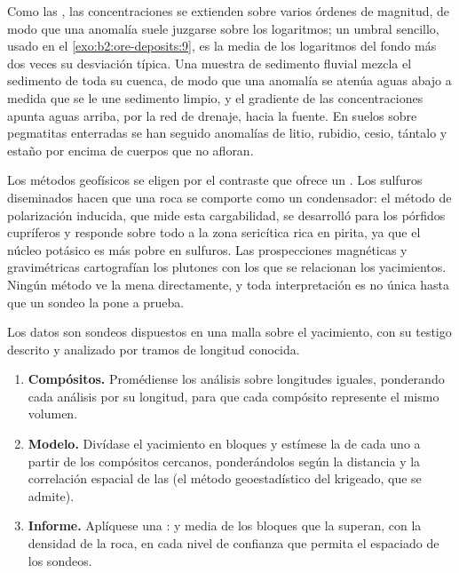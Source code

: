 Como las , las concentraciones se extienden sobre varios órdenes de magnitud, de modo que una anomalía suele juzgarse sobre
los logaritmos; un umbral sencillo, usado en el \cref{exo:b2:ore-deposits:9}, es la media de
los logaritmos del fondo más dos veces su desviación típica. Una muestra de sedimento fluvial
mezcla el sedimento de toda su cuenca, de modo que una anomalía se atenúa aguas abajo a medida que se le une sedimento limpio,
y el gradiente de las concentraciones apunta aguas arriba, por la red de drenaje, hacia la fuente. En suelos sobre
pegmatitas enterradas se han seguido anomalías de litio, rubidio, cesio, tántalo y estaño por encima de
cuerpos que no afloran.

Los métodos geofísicos se eligen por el contraste que ofrece un . Los sulfuros diseminados hacen que una
roca se comporte como un condensador: el método de polarización inducida, que mide esta cargabilidad, se
desarrolló para los pórfidos cupríferos y responde sobre todo a la zona sericítica rica en pirita, ya que el núcleo
potásico es más pobre en sulfuros. Las prospecciones magnéticas y gravimétricas cartografían los plutones con los que se relacionan
los yacimientos. Ningún método ve la mena
directamente, y toda interpretación es no única hasta que un sondeo la pone a prueba.

\begin{method}\label{met:b2:ore-deposits:resource}
Los datos son sondeos dispuestos en una malla sobre el yacimiento, con su testigo descrito y analizado por tramos
de longitud conocida.
\begin{enumerate}
  \item \textbf{Compósitos.} Promédiense los análisis sobre longitudes iguales, ponderando cada análisis por su
        longitud, para que cada compósito represente el mismo volumen.
  \item \textbf{Modelo.} Divídase el yacimiento en bloques y estímese la  de cada uno a partir de los
        compósitos cercanos, ponderándolos según la distancia y la correlación espacial de las 
        (el método geoestadístico del krigeado, que se admite).
  \item \textbf{Informe.} Aplíquese una :  y  media de los bloques que la superan, con la
        densidad de la roca, en cada nivel de confianza que permita el espaciado de los sondeos.
\end{enumerate}
\end{method}

